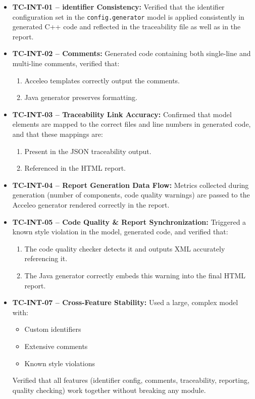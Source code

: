 \begin{itemize}
	\item \textbf{TC-INT-01 – \Gls{identifier} Consistency:} Verified that the \gls{identifier} configuration set in the \texttt{config.generator} model is applied consistently in generated C++ code and reflected in the traceability file as well as in the report.
	
	\item \textbf{TC-INT-02 – Comments:} Generated code containing both single-line and multi-line comments, verified that:
	\begin{enumerate}
		\item Acceleo templates correctly output the comments.
		\item Java generator preserves formatting.
	\end{enumerate}
	
	\item \textbf{TC-INT-03 – Traceability Link Accuracy:} Confirmed that model elements are mapped to the correct files and line numbers in generated code, and that these mappings are:
	\begin{enumerate}
		\item Present in the \gls{JSON} traceability output.
		\item Referenced in the \gls{HTML} report.
	\end{enumerate}
	
	\item \textbf{TC-INT-04 – Report Generation Data Flow:} Metrics collected during generation (number of components, code quality warnings) are passed to the Acceleo generator rendered correctly in the report.
	
	\item \textbf{TC-INT-05 – Code Quality \& Report Synchronization:} Triggered a known style violation in the model, generated code, and verified that:
	\begin{enumerate}
		\item The code quality checker detects it and outputs XML accurately referencing it.
		\item The Java generator correctly embeds this warning into the final HTML report.
	\end{enumerate}
	
	\item \textbf{TC-INT-07 – Cross-Feature Stability:} Used a large, complex model with:
	\begin{itemize}
		\item Custom \glspl{identifier}
		\item Extensive comments
		\item Known style violations
	\end{itemize}
	Verified that all features (\gls{identifier} config, comments, traceability, reporting, quality checking) work together without breaking any module.
\end{itemize}



